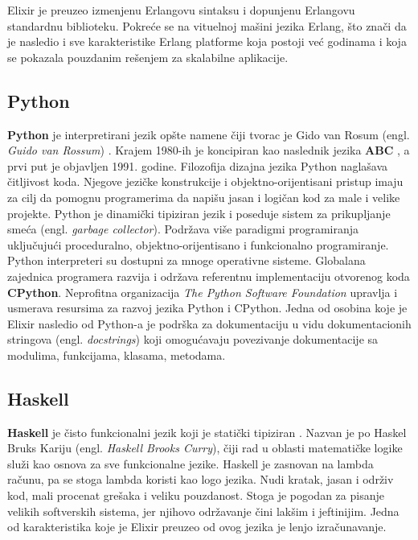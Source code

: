\documentclass[12pt,oneside]{memoir}
\begin{document}
Elixir je preuzeo izmenjenu Erlangovu sintaksu i dopunjenu Erlangovu standardnu biblioteku. Pokreće se na vituelnoj mašini jezika Erlang, što znači da je nasledio i sve karakteristike Erlang platforme koja postoji već godinama i koja se pokazala pouzdanim rešenjem za skalabilne aplikacije.

\subsection{Python}
\textbf{Python} je interpretirani jezik opšte namene čiji tvorac je Gido van Rosum (engl. \textit{Guido van Rossum}) \cite{Python}. Krajem 1980-ih je koncipiran kao naslednik jezika \textbf{ABC} \cite{ABC}, a prvi put je objavljen 1991. godine. Filozofija dizajna jezika Python naglašava čitljivost koda. Njegove jezičke konstrukcije i objektno-orijentisani pristup imaju za cilj da pomognu programerima da napišu jasan i logičan kod za male i velike projekte. Python je dinamički tipiziran jezik i poseduje sistem za prikupljanje smeća (engl. \textit{garbage collector}). Podržava više paradigmi programiranja uključujući proceduralno, objektno-orijentisano i funkcionalno programiranje. Python interpreteri su dostupni za mnoge operativne sisteme. Globalana zajednica programera razvija i održava referentnu implementaciju otvorenog koda \textbf{CPython}. Neprofitna organizacija \textit{The Python Software Foundation} upravlja i usmerava resursima za razvoj jezika Python i CPython. Jedna od osobina koje je Elixir nasledio od Python-a je podrška za dokumentaciju u vidu dokumentacionih stringova (engl. \textit{docstrings}) koji omogućavaju povezivanje dokumentacije sa modulima, funkcijama, klasama, metodama.

\newpage

\subsection{Haskell}
\textbf{Haskell} je čisto funkcionalni jezik koji je statički tipiziran \cite{Haskell}. Nazvan je po Haskel Bruks Kariju (engl. \textit{Haskell Brooks Curry}), čiji rad u oblasti matematičke logike služi kao osnova za sve funkcionalne jezike. Haskell je zasnovan na lambda računu, pa se stoga lambda koristi kao logo jezika. Nudi kratak, jasan i održiv kod, mali procenat grešaka i veliku pouzdanost. Stoga je pogodan za pisanje velikih softverskih sistema, jer njihovo održavanje čini lakšim i jeftinijim. Jedna od karakteristika koje je Elixir preuzeo od ovog jezika je lenjo izračunavanje.
\end{document}
